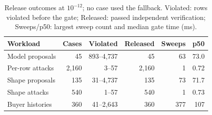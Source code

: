 \begin{table}[t]
\centering
\caption{Release outcomes at $10^{-12}$; no case used the fallback. Violated: rows violated before the gate; Released: passed independent verification; Sweeps/p50: largest sweep count and median gate time (ms).}
\label{tab:release}
\footnotesize
\setlength{\tabcolsep}{3.5pt}
\begin{tabular}{@{}lrrrrr@{}}
\toprule
Workload & Cases & Violated & Released & Sweeps & p50 \\
\midrule
Model proposals & 45 & 893--4{,}737 & 45 & 63 & 73.0 \\
Per-row attacks & 2{,}160 & 3--57 & 2{,}160 & 1 & 0.72 \\
Shape proposals & 135 & 31--4{,}737 & 135 & 73 & 71.7 \\
Shape attacks & 540 & 1--57 & 540 & 1 & 0.73 \\
Buyer histories & 360 & 41--2{,}643 & 360 & 377 & 107 \\
\bottomrule
\end{tabular}
\end{table}
